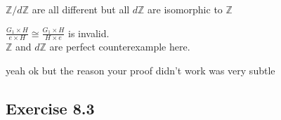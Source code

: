 \documentclass[15pt]{scrartcl}
\newcommand{\Z}{\mathbb{Z}}
\begin{document}
\begin{discussion*}
\begin{abboy*}
    \end{abboy*}
    \begin{arthur*}
        $\Z/d\Z$ are all different
but all $d\Z$ are isomorphic to $\Z$
    \end{arthur*}
    \begin{abboy*}
        $\frac{G_1\times H}{{e}\times H} \cong \frac{G_1\times H}{H\times {e}}$ is invalid.
        \\
        $\Z$ and $d\Z$ are perfect counterexample here. 
    \end{abboy*}
    \begin{abboy*}
        yeah ok but the reason your proof didn't work was very subtle
    \end{abboy*}
\end{discussion*}


\subsection{Exercise 8.3}
\end{document}
